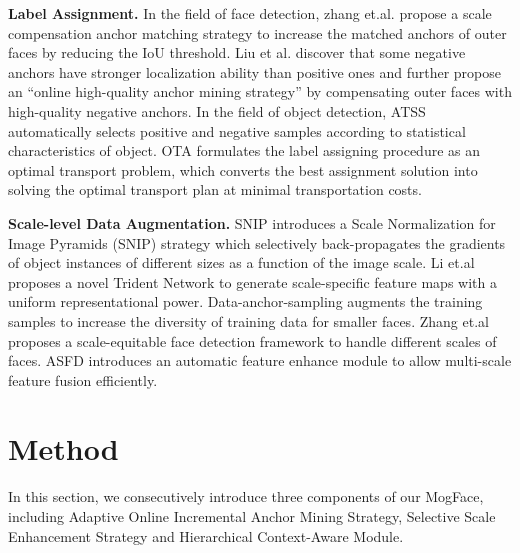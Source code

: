 \documentclass[10pt,twocolumn,letterpaper]{article}
\begin{document}
\noindent\textbf{Label Assignment.} In the field of face detection, zhang et.al. \cite{zhang2017s3fd} propose a scale compensation anchor matching strategy to increase the matched anchors of outer faces by reducing the IoU threshold. Liu et al. \cite{liu2019hambox} discover  that  some  negative  anchors  have  stronger  localization  ability  than  positive  ones  and  further  propose an “online high-quality anchor mining strategy” by compensating outer faces with high-quality negative anchors. In the field of object detection, ATSS \cite{zhang2020bridging} automatically selects
positive and negative samples according to statistical
characteristics of object. OTA \cite{ge2021ota} formulates the label assigning procedure as an optimal transport problem, which converts the best assignment solution into solving the optimal transport plan at minimal transportation costs. 
 
\noindent\textbf{Scale-level Data Augmentation. } SNIP \cite{singh2018analysis} introduces a Scale Normalization for Image Pyramids (SNIP) strategy which selectively back-propagates the gradients of object instances of different sizes as a function of the image scale. Li et.al \cite{li2019scale} proposes a novel Trident Network to generate scale-specific feature maps with a uniform representational power. Data-anchor-sampling \cite{tang2018pyramidbox} augments the training samples to increase the diversity of training data for smaller faces. Zhang et.al \cite{zhang2017s3fd} proposes a scale-equitable face detection framework to handle different scales of faces. ASFD \cite{zhang2020asfd} introduces an automatic feature enhance module to allow  multi-scale feature fusion efficiently. 



\section{Method}
\label{sec:Method}
In this section, we consecutively introduce three components of our MogFace, including Adaptive Online Incremental Anchor Mining Strategy, Selective Scale Enhancement Strategy and Hierarchical Context-Aware Module.
\end{document}
